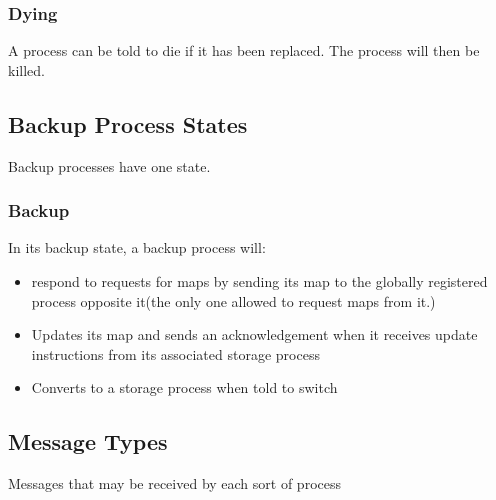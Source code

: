 \documentclass[a4paper]{article}
\begin{document}
\subsubsection{Dying}

A process can be told to die if it has been replaced. The process will then be killed.


\subsection{Backup Process States}

Backup processes have one state.

\subsubsection{Backup}

In its backup state, a backup process will:
\begin{itemize}
\item respond to requests for maps by sending its map to the globally registered process opposite it(the only one allowed to request maps from it.)
\item Updates its map and sends an acknowledgement when it receives update instructions from its associated storage process
\item Converts to a storage process when told to switch
\end{itemize}

\subsection{Message Types}

Messages that may be received by each sort of process
\end{document}
